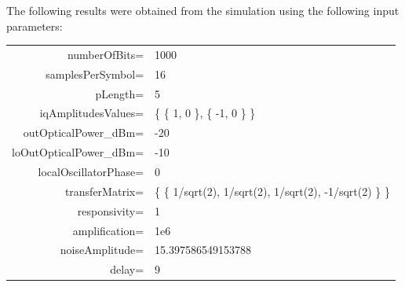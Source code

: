 \documentclass[a4paper]{article}
\begin{document}
The following results were obtained from the simulation using the following input parameters:
\begin{table}[H]
\centering
\begin{tabular}{rl}
numberOfBits=           & 1000                                                     \\
samplesPerSymbol=       & 16                                                       \\
pLength=                & 5                                                        \\
iqAmplitudesValues=     & \{ \{ 1, 0 \}, \{ -1, 0 \} \}                            \\
outOpticalPower\_dBm=   & -20                                                      \\
loOutOpticalPower\_dBm= & -10                                                      \\
localOscillatorPhase=   & 0                                                        \\
transferMatrix=         & \{ \{ 1/sqrt(2), 1/sqrt(2), 1/sqrt(2), -1/sqrt(2) \} \}  \\
responsivity=           & 1                                                        \\
amplification=          & 1e6                                                      \\
noiseAmplitude=         & 15.397586549153788                                       \\
delay=                  & 9                                                        \\
\end{tabular}
\end{table}
\end{document}

